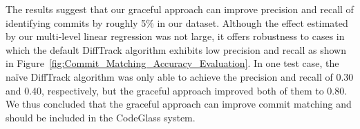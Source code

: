 The results suggest that our graceful approach can improve precision and recall of identifying commits by roughly 5\% in our dataset.
Although the effect estimated by our multi-level linear regression was not large, it offers robustness to cases in which the default DiffTrack algorithm exhibits low precision and recall as shown in Figure~\ref{fig:Commit_Matching_Accuracy_Evaluation}.
In one test case, the na\"{i}ve DiffTrack algorithm was only able to achieve the precision and recall of 0.30 and 0.40, respectively, but the graceful approach improved both of them to 0.80.
We thus concluded that the graceful approach can improve commit matching and should be included in the CodeGlass system.
